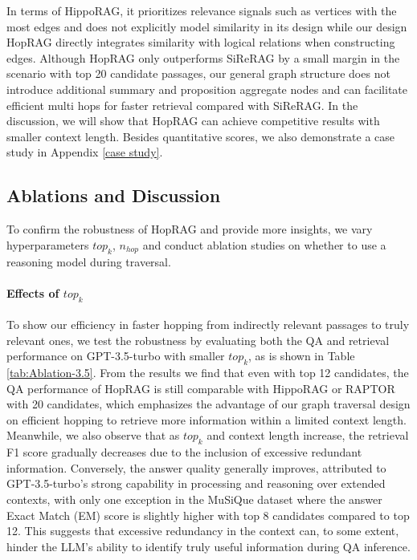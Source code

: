In terms of HippoRAG, it prioritizes relevance signals such as vertices with the most edges and does not explicitly model similarity in its design while our design HopRAG directly integrates similarity with logical relations when constructing edges. Although HopRAG only outperforms SiReRAG by a small margin in the scenario with top 20 candidate passages, our general graph structure does not introduce additional summary and proposition aggregate nodes and can facilitate efficient multi hops for faster retrieval compared with SiReRAG. In the discussion, we will show that HopRAG can achieve competitive results with smaller context length. Besides quantitative scores, we also demonstrate a case study in Appendix \ref{case study}.
\subsection{Ablations and Discussion}
\label{ablation}
To confirm the robustness of HopRAG and provide more insights, we vary hyperparameters $top_k$, $n_{hop}$ and conduct ablation studies on whether to use a reasoning model during traversal.

\paragraph{Effects of $top_k$} To show our efficiency in faster hopping from indirectly relevant passages to truly relevant ones, we test the robustness by evaluating both the QA and retrieval performance on GPT-3.5-turbo with smaller $top_k$, as is shown in Table \ref{tab:Ablation-3.5}. From the results we find that even with top 12 candidates, the QA performance of HopRAG is still comparable with HippoRAG or RAPTOR with 20 candidates, which emphasizes the advantage of our graph traversal design on efficient hopping to retrieve more information within a limited context length. Meanwhile, we also observe that as $top_k$ and context length increase, the retrieval F1 score gradually decreases due to the inclusion of excessive redundant information. Conversely, the answer quality generally improves, attributed to GPT-3.5-turbo's strong capability in processing and reasoning over extended contexts, with only one exception in the MuSiQue dataset where the answer Exact Match (EM) score is slightly higher with top 8 candidates compared to top 12. This suggests that excessive redundancy in the context can, to some extent, hinder the LLM's ability to identify truly useful information during QA inference. 

